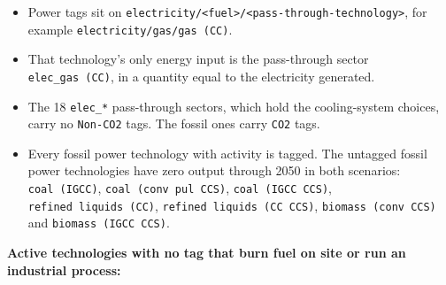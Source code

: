\begin{itemize}
\tightlist
\item
  Power
  tags sit
  on
  \texttt{electricity/\allowbreak{}\textless{}fuel\textgreater{}/\allowbreak{}\textless{}pass-\allowbreak{}through-\allowbreak{}technology\textgreater{}},
  for
  example
  \texttt{electricity/\allowbreak{}gas/\allowbreak{}gas\ (CC)}.
\item
  That
  technology's
  only
  energy
  input is
  the
  pass-through
  sector
  \texttt{elec\_\allowbreak{}gas\ (CC)},
  in a
  quantity
  equal to
  the
  electricity
  generated.
\item
  The 18
  \texttt{elec\_\allowbreak{}*}
  pass-through
  sectors,
  which
  hold the
  cooling-system
  choices,
  carry no
  \texttt{Non-\allowbreak{}CO2}
  tags.
  The
  fossil
  ones
  carry
  \texttt{CO2}
  tags.
\item
  Every
  fossil
  power
  technology
  with
  activity
  is
  tagged.
  The
  untagged
  fossil
  power
  technologies
  have
  zero
  output
  through
  2050 in
  both
  scenarios:
  \texttt{coal\ (IGCC)},
  \texttt{coal\ (conv\ pul\ CCS)},
  \texttt{coal\ (IGCC\ CCS)},
  \texttt{refined\ liquids\ (CC)},
  \texttt{refined\ liquids\ (CC\ CCS)},
  \texttt{biomass\ (conv\ CCS)}
  and
  \texttt{biomass\ (IGCC\ CCS)}.
\end{itemize}

\textbf{Active
technologies
with no
tag that
burn fuel
on site or
run an
industrial
process:}

